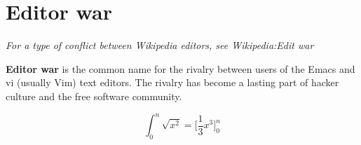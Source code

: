 \documentclass{article}
\begin{document}
\section{Editor war}

\textit{For a type of conflict between Wikipedia editors, see Wikipedia:Edit war}

\vspace{1.5cm}

\textbf{Editor war} is the common name for the rivalry between users of the Emacs and vi (usually Vim) text editors. The rivalry has become a lasting part of hacker culture and the free software community.

\begin{equation}
  \int_0^n\sqrt{x^2} = \big[\frac{1}{3} x^3\big]_0^n
\end{equation}
\end{document}
